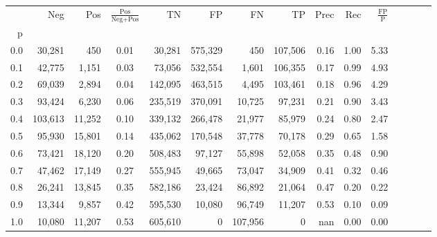 \begin{tabular}{rrrcrrrrrrrrrrr}
\toprule
{} &      Neg &     Pos & $\frac{\text{Pos}}{\text{Neg}+\text{Pos}}$ &       TN &       FP &       FN &       TP &  Prec &   Rec & $\frac{\text{FP}}{\text{P}}$ \\
p   &          &         &                                            &          &          &          &          &       &       &                              \\
\midrule
0.0 &   30,281 &     450 &                                       0.01 &   30,281 &  575,329 &      450 &  107,506 &  0.16 &  1.00 &                         5.33 \\
0.1 &   42,775 &   1,151 &                                       0.03 &   73,056 &  532,554 &    1,601 &  106,355 &  0.17 &  0.99 &                         4.93 \\
0.2 &   69,039 &   2,894 &                                       0.04 &  142,095 &  463,515 &    4,495 &  103,461 &  0.18 &  0.96 &                         4.29 \\
0.3 &   93,424 &   6,230 &                                       0.06 &  235,519 &  370,091 &   10,725 &   97,231 &  0.21 &  0.90 &                         3.43 \\
0.4 &  103,613 &  11,252 &                                       0.10 &  339,132 &  266,478 &   21,977 &   85,979 &  0.24 &  0.80 &                         2.47 \\
0.5 &   95,930 &  15,801 &                                       0.14 &  435,062 &  170,548 &   37,778 &   70,178 &  0.29 &  0.65 &                         1.58 \\
0.6 &   73,421 &  18,120 &                                       0.20 &  508,483 &   97,127 &   55,898 &   52,058 &  0.35 &  0.48 &                         0.90 \\
0.7 &   47,462 &  17,149 &                                       0.27 &  555,945 &   49,665 &   73,047 &   34,909 &  0.41 &  0.32 &                         0.46 \\
0.8 &   26,241 &  13,845 &                                       0.35 &  582,186 &   23,424 &   86,892 &   21,064 &  0.47 &  0.20 &                         0.22 \\
0.9 &   13,344 &   9,857 &                                       0.42 &  595,530 &   10,080 &   96,749 &   11,207 &  0.53 &  0.10 &                         0.09 \\
1.0 &   10,080 &  11,207 &                                       0.53 &  605,610 &        0 &  107,956 &        0 &   nan &  0.00 &                         0.00 \\
\bottomrule
\end{tabular}
